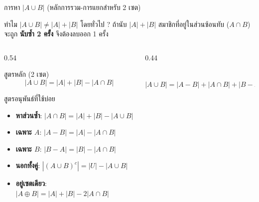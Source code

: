 \begin{frame}{การหา $|A \cup B|$ (หลักการรวม-การแยกสำหรับ 2 เซต)}
  \begin{alertblock}{ทำไม $|A \cup B| \neq |A| + |B|$ โดยทั่วไป ?}
    ถ้านับ $|A| + |B|$ สมาชิกที่อยู่ในส่วนซ้อนทับ ($A \cap B$) จะถูก \textbf{นับซ้ำ 2 ครั้ง} จึงต้องลบออก 1 ครั้ง
  \end{alertblock}
  \begin{columns}[T]
    \begin{column}{0.54\textwidth}
      \begin{block}{สูตรหลัก (2 เซต)}
        \[ |A \cup B| = |A| + |B| - |A \cap B| \]
      \end{block}
      \begin{block}{สูตรอนุพันธ์ที่ใช้บ่อย}
        \begin{itemize}\small
          \item \textbf{หาส่วนซ้ำ}: $|A \cap B| = |A| + |B| - |A \cup B|$
          \item \textbf{เฉพาะ $A$}: $|A - B| = |A| - |A \cap B|$
          \item \textbf{เฉพาะ $B$}: $|B - A| = |B| - |A \cap B|$
          \item \textbf{นอกทั้งคู่}: $|(A \cup B)^c| = |U| - |A \cup B|$
          \item \textbf{อยู่เซตเดียว}: $|A \oplus B| = |A| + |B| - 2|A \cap B|$
        \end{itemize}
      \end{block}
    \end{column}
    \begin{column}{0.44\textwidth}
      \begin{center}
      \\
      \footnotesize $|A \cup B| = |A-B| + |A\cap B| + |B-A|$
      \end{center}
    \end{column}
  \end{columns}
\end{frame}

